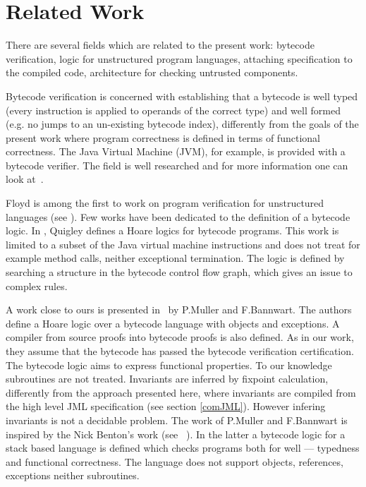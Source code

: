 \section{Related Work} \label{relWork}
    
There are several fields which are related to the present work: bytecode verification, logic for unstructured program languages, attaching specification to the compiled code, architecture for checking untrusted components.

 Bytecode verification is concerned with establishing that a bytecode is well typed 
(every instruction is applied to operands of the correct type) and well formed 
(e.g. no jumps to an un-existing bytecode index), differently from the goals of the present
work where program correctness is defined in terms of functional correctness. The Java Virtual Machine (JVM), for example, is provided with a bytecode verifier. 
The field is well researched and for more information one can look at~\cite{Ljbc}.  

Floyd is among the first to work on program verification for unstructured languages (see \cite{F67amp}).
Few works have been dedicated to the definition of a bytecode logic. In \cite{Quigley}, Quigley defines a Hoare logics for bytecode programs. 
 This work is limited to a subset of the Java virtual machine instructions and does not treat for example method calls, 
 neither exceptional termination. The logic is defined by searching a structure in the bytecode control flow graph, 
 which gives an issue to complex rules.

A work close to ours is presented in~\cite{BM05plb} by P.Muller and F.Bannwart. The authors define a Hoare logic over a 
bytecode language with objects and  exceptions. A compiler from source proofs into bytecode proofs is also defined. 
As in our work, they assume that the bytecode has passed the bytecode verification certification. The bytecode logic aims to 
express functional properties. To our knowledge subroutines are not treated. Invariants are inferred by fixpoint calculation, differently 
from the approach presented here, where invariants are compiled from the high level JML specification (see section \ref{comJML}). 
However infering invariants is not a decidable problem. The work of P.Muller and F.Bannwart is inspired by the Nick Benton's work (see ~\cite{B04tlsj}). 
In the latter a bytecode logic for a stack based language is defined which checks programs both for well --- typedness and functional correctness. 
 The language does not support objects, references, exceptions neither subroutines. 

